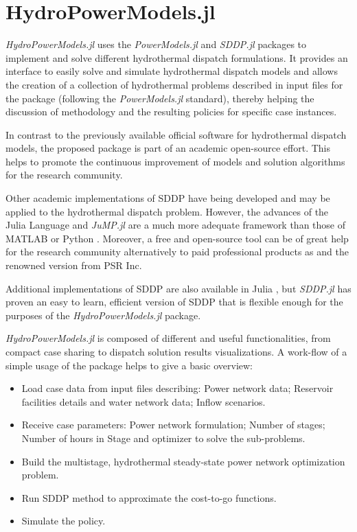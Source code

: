 \documentclass{juliacon}
\begin{document}
\section{HydroPowerModels.jl}
\label{sec:hydropowermodels}

\textit{HydroPowerModels.jl} uses the \textit{PowerModels.jl} and \textit{SDDP.jl} packages to implement and solve different hydrothermal dispatch formulations. It provides an interface to easily solve and simulate hydrothermal dispatch models and allows the creation of a collection of hydrothermal problems described in input files for the package (following the \textit{PowerModels.jl} standard), thereby helping the discussion of methodology and the resulting policies for specific case instances. 

In contrast to the previously available official software for hydrothermal dispatch models, the proposed package is part of an academic open-source effort. This helps to promote the continuous improvement of models and solution algorithms for the research community.

Other academic implementations of SDDP have being developed and may be applied to the hydrothermal dispatch problem. However, the advances of the Julia Language and \textit{JuMP.jl} are a much more adequate framework than those of MATLAB \cite{FATS} or Python \cite{raso2016optimist,sddpy}.  Moreover, a free and open-source tool can be of great help for the research community alternatively to paid professional products as \cite{lohndorf2018quasar} and the renowned version from PSR Inc.

Additional implementations of SDDP are also available in Julia \cite{leclerestochdynamicprogramming} \cite{StructDualDynProg}, but \textit{SDDP.jl} \cite{dowson_sddp.jl} has proven an easy to learn, efficient version of SDDP that is flexible enough for the purposes of the \textit{HydroPowerModels.jl} package.

\textit{HydroPowerModels.jl} is composed of different and useful functionalities, from compact case sharing to dispatch solution results visualizations. A work-flow of a simple usage of the package helps to give a basic overview:

\begin{itemize}
    \item Load case data from input files describing: Power network data; Reservoir facilities details and water network data; Inflow scenarios.
    \item Receive case parameters: Power network formulation; Number of stages; Number of hours in Stage and optimizer to solve the sub-problems. 
    \item Build the multistage, hydrothermal steady-state power network optimization problem.
    \item Run SDDP method to approximate the cost-to-go functions.
    \item Simulate the policy.
\end{itemize}
\end{document}
